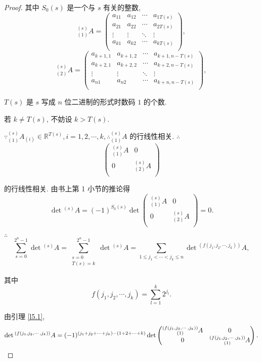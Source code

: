 \documentclass{ctexart}
\begin{document}
\begin{proof}
    其中 $S_0(s)$ 是一个与 $s$ 有关的整数,
    \[{}_{(1)}^{(s)}A=\begin{pmatrix}
        a_{11} & a_{12} & \cdots & a_{1T(s)} \\
        a_{21} & a_{22} & \cdots & a_{2T(s)} \\
        \vdots & \vdots & \ddots & \vdots \\
        a_{k1} & a_{k2} & \cdots & a_{kT(s)} \\
    \end{pmatrix},\]
    \[{}_{(2)}^{(s)}A=\begin{pmatrix}
        a_{k+1,1} & a_{k+1,2} & \cdots & a_{k+1,n-T(s)} \\
        a_{k+2,1} & a_{k+2,2} & \cdots & a_{k+2,n-T(s)} \\
        \vdots & \vdots & \ddots & \vdots \\
        a_{n1} & a_{n2} & \cdots & a_{k+n,n-T(s)} \\
    \end{pmatrix},\]

    $T(s)$ 是 $s$ 写成 $n$ 位二进制的形式时数码 $1$ 的个数.

    若 $k\neq T(s)$, 不妨设 $k>T(s)$.

    $\because{}_{(1)}^{(s)}A_{(i)}\in\mathbb{R}^{T(s)},i=1,2,\cdots,k,\therefore{}_{(1)}^{(s)}A$ 的行线性相关. $\therefore$
    \[\begin{pmatrix}
        {}_{(1)}^{(s)}A & 0 \\
        0 & {}_{(2)}^{(s)}A \\
    \end{pmatrix}\]

    的行线性相关. 由书上第 1 小节的推论得
    \[\det{}^{(s)}A=(-1)^{S_0(s)}\det\begin{pmatrix}
        {}_{(1)}^{(s)}A & 0 \\
        0 & {}_{(2)}^{(s)}A \\
    \end{pmatrix}=0.\]

    $\therefore$
    \[\sum\limits_{s=0}^{2^n-1}\det{}^{(s)}A=\sum\limits_{\substack{s=0\\T(s)=k}}^{2^n-1}\det{}^{(s)}A=\sum\limits_{1\leq j_1<\cdots<j_k\leq n}\det{}^{(f(j_1,j_2,\cdots,j_k))}A,\]

    其中
    \[f(j_1,j_2,\cdots,j_k)=\sum\limits_{l=1}^k2^{j_l}.\]

    由引理 \ref{l5.1},
    \[\det{}^{(f(j_1,j_2,\cdots,j_k))}A=(-1)^{(j_1+j_2+\cdots+j_k)-(1+2+\cdots+k)}\det\begin{pmatrix}
        \begin{subarray}{c}
            (f(j_1,j_2,\cdots,j_k)) \\
            (1)
        \end{subarray}A & 0 \\
        0 & \begin{subarray}{c}
                (f(j_1,j_2,\cdots,j_k)) \\
                (1)
            \end{subarray}A \\
    \end{pmatrix}.\]


\end{proof}
\end{document}
